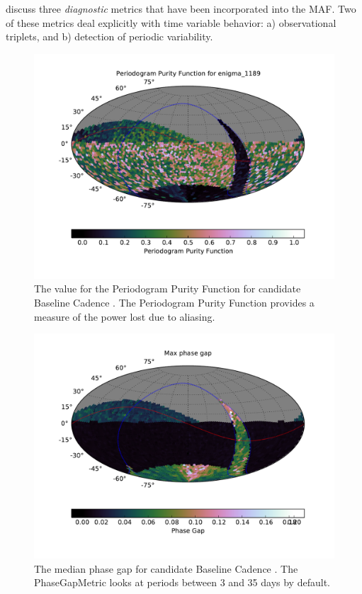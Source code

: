 \citet{LundEtal2016} discuss three {\it diagnostic} metrics that have been
incorporated into the MAF. Two of these metrics deal explicitly with time
variable behavior: a) observational triplets, and b) detection of periodic
variability.

\begin{figure}[tbh!]
\includegraphics{figs/variables/enigma_1189_PeriodogramPurity_OPSI_SkyMap.pdf}
\caption{The value for the Periodogram Purity Function for candidate
Baseline Cadence . The Periodogram Purity
Function provides a measure of the power lost due to aliasing.}
\label{fig:enigmaPeriodogramPurity}
\end{figure}


\begin{figure}[tbh!]
\includegraphics{figs/variables/enigma_1189_Phase_Gap_MedianGap_OPSI_SkyMap.pdf}
\caption{The median phase gap for candidate Baseline Cadence .
The PhaseGapMetric looks at periods between 3 and 35 days by default.}
\label{fig:enigmaMedianGap}
\end{figure}

